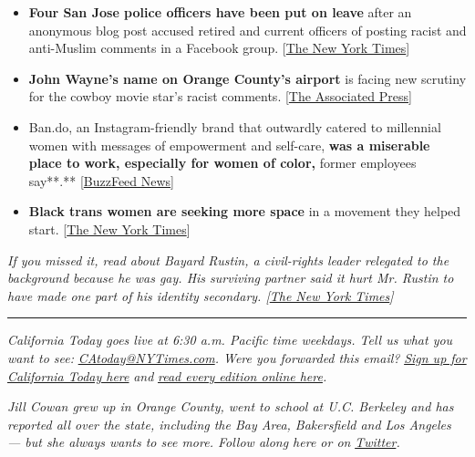 \begin{itemize}
\item
  \textbf{Four San Jose police officers have been put on leave} after an
  anonymous blog post accused retired and current officers of posting
  racist and anti-Muslim comments in a Facebook group.
  {[}\href{https://www.nytimes3xbfgragh.onion/2020/06/28/us/san-jose-police-facebook.html?smid=tw-nytimes\&smtyp=cur}{The
  New York Times}{]}
\item
  \textbf{John Wayne's name on Orange County's airport} is facing new
  scrutiny for the cowboy movie star's racist comments.
  {[}\href{https://apnews.com/880ee2b8c9c02bd95ce902a5c3343b1f}{The
  Associated Press}{]}
\item
  Ban.do, an Instagram-friendly brand that outwardly catered to
  millennial women with messages of empowerment and self-care,
  \textbf{was a miserable place to work, especially for women of color,}
  former employees say**.**
  {[}\href{https://www.buzzfeednews.com/article/stephaniemcneal/bando-jen-gotch-lifeguard-press-racist-toxic-behavior}{BuzzFeed
  News}{]}
\item
  \textbf{Black trans women are seeking more space} in a movement they
  helped start.
  {[}\href{https://www.nytimes3xbfgragh.onion/2020/06/27/us/politics/black-trans-lives-matter.html?referringSource=articleShare}{The
  New York Times}{]}
\end{itemize}

\emph{If you missed it, read about Bayard Rustin, a civil-rights leader
relegated to the background because he was gay. His surviving partner
said it hurt Mr. Rustin to have made one part of his identity secondary.
{[}}\href{https://www.nytimes3xbfgragh.onion/2020/01/21/us/california-mlk-lgbtq-bayard-rustin.html}{\emph{The
New York Times}}\emph{{]}}

\begin{center}\rule{0.5\linewidth}{\linethickness}\end{center}

\emph{California Today goes live at 6:30 a.m. Pacific time weekdays.
Tell us what you want to see:}
\href{mailto:CAtoday@NYTimes.com}{\emph{CAtoday@NYTimes.com}}\emph{.
Were you forwarded this email?}
\href{https://www.nytimes3xbfgragh.onion/newsletters/california-today?module=inline}{\emph{Sign
up for California Today here}} \emph{and}
\href{https://www.nytimes3xbfgragh.onion/column/california-today}{\emph{read
every edition online here}}\emph{.}

\emph{Jill Cowan grew up in Orange County, went to school at U.C.
Berkeley and has reported all over the state, including the Bay Area,
Bakersfield and Los Angeles --- but she always wants to see more. Follow
along here or on}
\href{https://twitter.com/JillCowan}{\emph{Twitter}}\emph{.}

